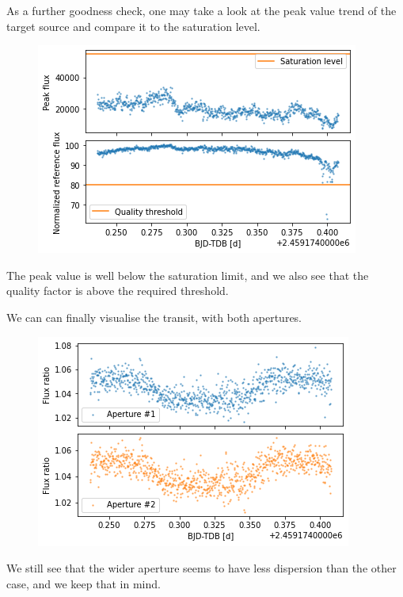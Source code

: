 \documentclass[a4paper,11pt,twocolumn]{article}
\begin{document}
As a further goodness check, one may take a look at the peak value trend of 
the target source and compare it to the saturation level.
\begin{figure}[H]
    \centering  
    \includegraphics[scale=0.45, angle=0]{../pictures/taste/saturation-quality.png}
\end{figure}
The peak value is well below the saturation limit, and we also see that the 
quality factor is above the required threshold.

We can can finally visualise the transit, with both apertures.
\begin{figure}[H]
    \centering  
    \includegraphics[scale=0.45, angle=0]{../pictures/taste/transits.png}
\end{figure}
We still see that the wider aperture seems to have less dispersion than 
the other case, and we keep that in mind.
\end{document}
